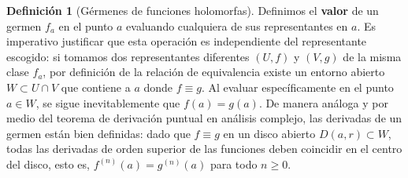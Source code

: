 \documentclass[11pt,a4paper]{article}
\theoremstyle{definition}
\newtheorem{definicion}{Definición}[section]
\theoremstyle{remark}
\numberwithin{equation}{section}
\begin{document}
\begin{definicion}[Gérmenes de funciones holomorfas]
Definimos el \textbf{valor} de un germen $f_a$ en el punto $a$ evaluando cualquiera de sus representantes en $a$. Es imperativo justificar que esta operación es independiente del representante escogido: si tomamos dos representantes diferentes $(U, f)$ y $(V, g)$ de la misma clase $f_a$, por definición de la relación de equivalencia existe un entorno abierto $W \subset U \cap V$ que contiene a $a$ donde $f \equiv g$. Al evaluar específicamente en el punto $a \in W$, se sigue inevitablemente que $f(a) = g(a)$. De manera análoga y por medio del teorema de derivación puntual en análisis complejo, las derivadas de un germen están bien definidas: dado que $f \equiv g$ en un disco abierto $D(a, r) \subset W$, todas las derivadas de orden superior de las funciones deben coincidir en el centro del disco, esto es, $f^{(n)}(a) = g^{(n)}(a)$ para todo $n \geq 0$.
\end{definicion}
\end{document}
